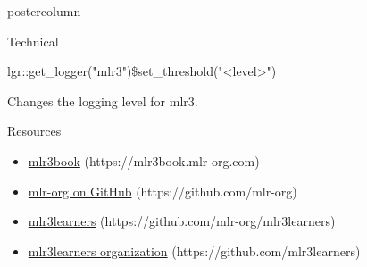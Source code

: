 \documentclass{beamer}
\begin{document}
\begin{withoutheader}
\begin{frame}[fragile]{}
\begin{columns}
\begin{column}{.245\textwidth}
\begin{beamercolorbox}[center]{postercolumn}
\begin{minipage}{.98\textwidth}
{\begin{myblock}{Technical}
							\\
							\begin{codeboxmultiline}[width=25cm]
								\footnotesize{
								lgr::get\_logger("mlr3")\$set\_threshold("<level>")
							}
							\end{codeboxmultiline}
							Changes the logging level for {mlr3}.
						\end{myblock}
						\begin{myblock}{Resources}
							\begin{itemize}
								\item \href{https://mlr3book.mlr-org.com/index.html}{mlr3book} (https://mlr3book.mlr-org.com)
								\item \href{https://github.com/mlr-org}{mlr-org on GitHub} (https://github.com/mlr-org)
								\item \href{https://github.com/mlr-org/mlr3learners}{mlr3learners} (https://github.com/mlr-org/mlr3learners)
								\item \href{https://github.com/mlr3learners}{mlr3learners organization} (https://github.com/mlr3learners)
								\vspace{1em}
							\end{itemize}
						\end{myblock}
						\vfill
					}
				\end{minipage}
			\end{beamercolorbox}
		\end{column}
	\end{columns}
\end{frame}
\end{withoutheader}
\end{document}
